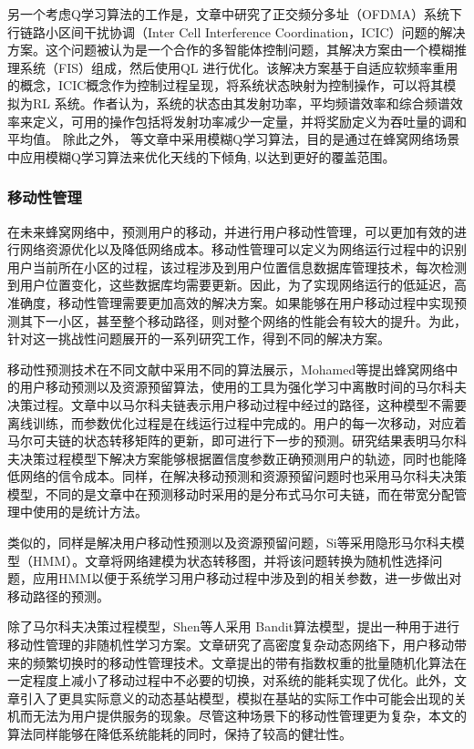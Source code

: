 \documentclass{IEEEtran}
\begin{document}
另一个考虑Q学习算法的工作是\cite{Dirani2010}，文章中研究了正交频分多址（OFDMA）系统下行链路小区间干扰协调（Inter Cell Interference Coordination，ICIC）问题的解决方案。这个问题被认为是一个合作的多智能体控制问题，其解决方案由一个模糊推理系统（FIS）组成，然后使用QL 进行优化。该解决方案基于自适应软频率重用的概念，ICIC概念作为控制过程呈现，将系统状态映射为控制操作，可以将其模拟为RL 系统。作者认为，系统的状态由其发射功率，平均频谱效率和综合频谱效率来定义，可用的操作包括将发射功率减少一定量，并将奖励定义为吞吐量的调和平均值。
除此之外，\cite{Razavi2010}\cite{Razavi2010a}\cite{Islam2012} 等文章中采用模糊Q学习算法，目的是通过在蜂窝网络场景中应用模糊Q学习算法来优化天线的下倾角, 以达到更好的覆盖范围。

\subsubsection{移动性管理}
在未来蜂窝网络中，预测用户的移动，并进行用户移动性管理，可以更加有效的进行网络资源优化以及降低网络成本。移动性管理可以定义为网络运行过程中的识别用户当前所在小区的过程，该过程涉及到用户位置信息数据库管理技术，每次检测到用户位置变化，这些数据库均需要更新。因此，为了实现网络运行的低延迟，高准确度，移动性管理需要更加高效的解决方案。如果能够在用户移动过程中实现预测其下一小区，甚至整个移动路径，则对整个网络的性能会有较大的提升。为此，针对这一挑战性问题展开的一系列研究工作，得到不同的解决方案。

移动性预测技术在不同文献中采用不同的算法展示，Mohamed等\cite{Mohamed2015}提出蜂窝网络中的用户移动预测以及资源预留算法，使用的工具为强化学习中离散时间的马尔科夫决策过程。文章中以马尔科夫链表示用户移动过程中经过的路径，这种模型不需要离线训练，而参数优化过程是在线运行过程中完成的。用户的每一次移动，对应着马尔可夫链的状态转移矩阵的更新，即可进行下一步的预测。研究结果表明马尔科夫决策过程模型下解决方案能够根据置信度参数正确预测用户的轨迹，同时也能降低网络的信令成本。同样，\cite{Fazio2013}在解决移动预测和资源预留问题时也采用马尔科夫决策模型，不同的是文章中在预测移动时采用的是分布式马尔可夫链，而在带宽分配管理中使用的是统计方法。

类似的，同样是解决用户移动性预测以及资源预留问题，Si等\cite{Si2010}采用隐形马尔科夫模型（HMM）。文章将网络建模为状态转移图，并将该问题转换为随机性选择问题，应用HMM以便于系统学习用户移动过程中涉及到的相关参数，进一步做出对移动路径的预测。

除了马尔科夫决策过程模型，Shen等人采用 Bandit算法模型\cite{Shen2016}，提出一种用于进行移动性管理的非随机性学习方案。文章研究了高密度复杂动态网络下，用户移动带来的频繁切换时的移动性管理技术。文章提出的带有指数权重的批量随机化算法在一定程度上减小了移动过程中不必要的切换，对系统的能耗实现了优化。此外，文章引入了更具实际意义的动态基站模型，模拟在基站的实际工作中可能会出现的关机而无法为用户提供服务的现象。尽管这种场景下的移动性管理更为复杂，本文的算法同样能够在降低系统能耗的同时，保持了较高的健壮性。
\end{document}
